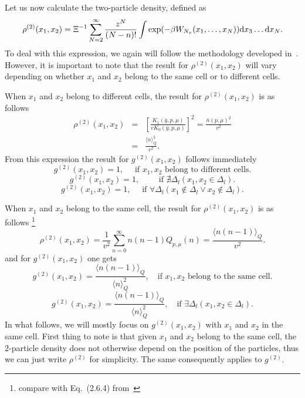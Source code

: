 Let us now calculate the two-particle density, defined as
\begin{equation*}
	\rho^{(2)} (x_1, x_2) = \Xi^{-1} \sum_{N=2}^{\infty} \frac{z^N}{(N-n)!} \int \exp(-\beta W_{N_v}(x_1, \dotsc, x_N)) {\rm d} x_3 \dotsc {\rm d} x_N.
\end{equation*}
To deal with this expression, we again will follow the methodology developed in~\cite{KozitskyKozlovskiiDobush2020}. However, it is important to note that the result for $\rho^{(2)}(x_1, x_2)$ will vary depending on whether $x_1$ and $x_2$ belong to the same cell or to different cells.

When $x_1$ and $x_2$ belong to different cells, the result for $\rho^{(2)}(x_1, x_2)$ is as follows
\begin{eqnarray}
	\rho^{(2)} (x_1, x_2) & = & \left[\frac{K_1(\bar{y}, p, \mu)}{v K_0(\bar{y}, p, \mu)}\right]^2 
	= \frac{\bar{n}(p, \mu)^2}{v^2}
	\nonumber \\
	& = & \frac{\langle n \rangle_{Q}^2}{v^2}.
\end{eqnarray}
From this expression the result for $g^{(2)}(x_1, x_2)$ follows immediately
\begin{equation}
	g^{(2)}(x_1, x_2) = 1, \quad \text{ if } x_1, x_2 \text{ belong to different cells}.
\end{equation}
\begin{equation*}
	g^{(2)}(x_1, x_2) = 1, \qquad \text{ if } \nexists \Delta_l (x_1, x_2 \in \Delta_l).
\end{equation*}
\begin{equation*}
	g^{(2)}(x_1, x_2) = 1, \quad \text{ if } \forall \Delta_l (x_1 \notin \Delta_l \lor x_2 \notin \Delta_l).
\end{equation*}

When $x_1$ and $x_2$ belong to the same cell, the result for $\rho^{(2)}(x_1, x_2)$ is as follows
\footnote{compare with Eq.~(2.6.4) from~\cite{hansen2013theory}}
\begin{equation}
	\rho^{(2)}(x_1, x_2) = \frac{1}{v^2} \sum_{n=0}^{\infty} n(n-1) Q_{p, \mu}(n) 
	= \frac{\langle n(n-1) \rangle_{Q}}{v^2}.
\end{equation}
and for $g^{(2)}(x_1, x_2)$ one gets
\begin{equation}
	g^{(2)}(x_1, x_2) = \frac{\langle n(n-1) \rangle_{Q}}{\langle n \rangle_{Q}^2}, \quad \text{if } x_1, x_2 \text{ belong to the same cell}.
\end{equation}
\begin{equation*}
	g^{(2)}(x_1, x_2) = \frac{\langle n(n-1) \rangle_{Q}}{\langle n \rangle_{Q}^2}, \quad \text{if } \exists \Delta_l (x_1, x_2 \in \Delta_l).
\end{equation*}
In what follows, we will mostly focus on $g^{(2)}(x_1, x_2)$ with $x_1$ and $x_2$ in the same cell.
First thing to note is that given $x_1$ and $x_2$ belong to the same cell, the $2$-particle density does not otherwise depend on the position of the particles, thus we can just write $\rho^{(2)}$ for simplicity. The same consequently applies to $g^{(2)}$.

